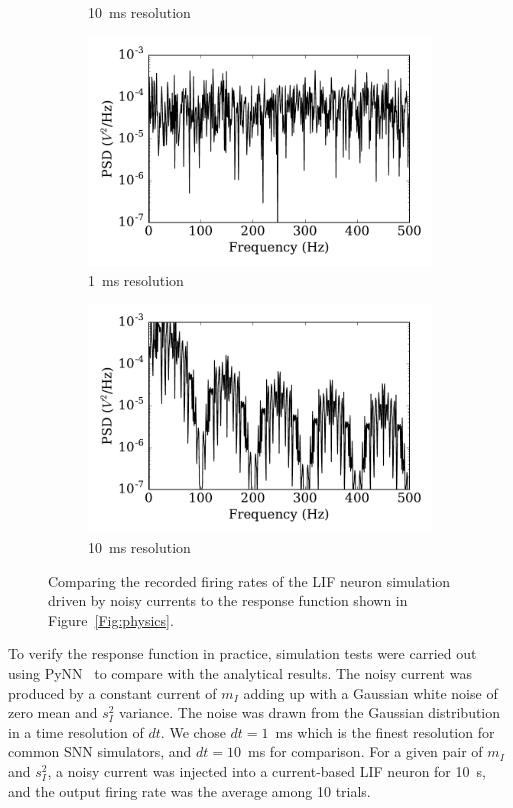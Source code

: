 \begin{figure}[tbp!]
\begin{subfigure}[t]{0.49\textwidth}
			\caption{10~ms resolution}
			\label{Fig:gaussian-10}
		\end{subfigure}
		\begin{subfigure}[t]{0.49\textwidth}
			\includegraphics[width=\textwidth]{pics_iconip/psd_dt1.pdf}
			\caption{1~ms resolution}
			\label{Fig:spectrum-1}
		\end{subfigure}
		\begin{subfigure}[t]{0.49\textwidth}
			\includegraphics[width=\textwidth]{pics_iconip/psd_dt10.pdf}
			\caption{10~ms resolution}
			\label{Fig:spectrum-10}
		\end{subfigure}
		\caption{Comparing the recorded firing rates of the LIF neuron simulation driven by noisy currents to the response function shown in Figure~\ref{Fig:physics}.}
		\label{Fig:lif_curr}
	\end{figure}

	To verify the response function in practice, simulation tests were carried out using PyNN~\cite{davison2008pynn} to compare with the analytical results.
	The noisy current was produced by a constant current of $m_I$ adding up with a Gaussian white noise of zero mean and $s_I^2$ variance.
	The noise was drawn from the Gaussian distribution in a time resolution of $dt$.
	We chose $dt=1$~ms which is the finest resolution for common SNN simulators, and $dt=10$~ms for comparison.
	For a given pair of $m_I$ and $s_I^2$, a noisy current was injected into a current-based LIF neuron for 10~s, and the output firing rate was the average among 10 trials.
	
